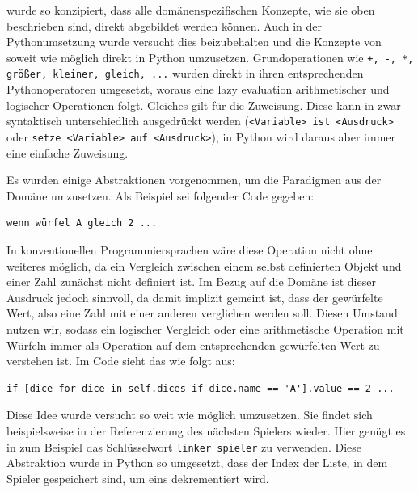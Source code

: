 	\dg wurde so konzipiert, dass alle domänenspezifischen Konzepte, wie sie oben beschrieben sind, direkt abgebildet werden können. Auch in der Pythonumsetzung wurde versucht dies beizubehalten und die Konzepte von \dg soweit wie möglich direkt in Python umzusetzen. Grundoperationen wie \texttt{+, -, *, größer, kleiner, gleich, ...} wurden direkt in ihren entsprechenden Pythonoperatoren umgesetzt, woraus eine lazy evaluation arithmetischer und logischer Operationen folgt. Gleiches gilt für die Zuweisung. Diese kann in \dg zwar syntaktisch unterschiedlich ausgedrückt werden (\texttt{<Variable> ist <Ausdruck>} oder \texttt{setze <Variable> auf <Ausdruck>}), in Python wird daraus aber immer eine einfache Zuweisung.

	Es wurden einige Abstraktionen vorgenommen, um die Paradigmen aus der Domäne umzusetzen. Als Beispiel sei folgender Code gegeben:
\begin{lstlisting}
wenn würfel A gleich 2 ...
\end{lstlisting}
	In konventionellen Programmiersprachen wäre diese Operation nicht ohne weiteres möglich, da ein Vergleich zwischen einem selbst definierten Objekt und einer Zahl zunächst nicht definiert ist. Im Bezug auf die Domäne ist dieser Ausdruck jedoch sinnvoll, da damit implizit gemeint ist, dass der gewürfelte Wert, also eine Zahl mit einer anderen verglichen werden soll. Diesen Umstand nutzen wir, sodass ein logischer Vergleich oder eine arithmetische Operation mit Würfeln immer als Operation auf dem entsprechenden gewürfelten Wert zu verstehen ist. Im Code sieht das wie folgt aus:
\begin{lstlisting}
if [dice for dice in self.dices if dice.name == 'A'].value == 2 ...
\end{lstlisting}
	Diese Idee wurde versucht so weit wie möglich umzusetzen. Sie findet sich beispielsweise in der Referenzierung des nächsten Spielers wieder. Hier genügt es in \dg zum Beispiel das Schlüsselwort \texttt{linker spieler} zu verwenden. Diese Abstraktion wurde in Python so umgesetzt, dass der Index der Liste, in dem Spieler gespeichert sind, um eins dekrementiert wird.

